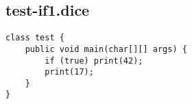 \subsection{test-if1.dice}
\begin{verbatim}
class test {
	public void main(char[][] args) {
  		if (true) print(42);
  		print(17);
	}
}

\end{verbatim}